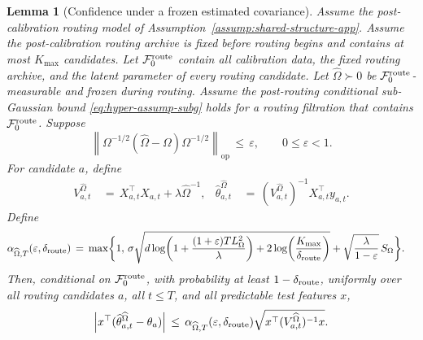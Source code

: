 \documentclass{article} %
\newtheorem{lemma}[theorem]{Lemma}
\begin{document}
\begin{lemma}[Confidence under a frozen estimated covariance]
\label{lem:confidence-under-frozen-omegahat-final}
Assume the post-calibration routing model of
Assumption~\ref{assump:shared-structure-app}.  Assume the post-calibration
routing archive is fixed before routing begins and contains at most
\(K_{\max}\) candidates. Let \(\mathcal F_0^{\rm route}\) contain all
calibration data, the fixed routing archive, and the latent parameter of every
routing candidate.
Let \(\widehat\Omega\succ0\) be
\(\mathcal F_0^{\rm route}\)-measurable and frozen during routing. Assume the
post-routing conditional sub-Gaussian bound
\eqref{eq:hyper-assump-subg} holds for a routing filtration that contains
\(\mathcal F_0^{\rm route}\). Suppose
\begin{equation}
\left\|
\Omega^{-1/2}(\widehat\Omega-\Omega)\Omega^{-1/2}
\right\|_{\mathrm{op}}
\,\leq\,
\varepsilon,
\qquad
0\leq\varepsilon<1.
\end{equation}
For candidate \(a\), define
\begin{equation}
\begin{aligned}
V_{a,t}^{\widehat\Omega}
&\,=\,
X_{a,t}^\top X_{a,t}+\lambda\widehat\Omega^{-1},
&
\widehat\theta_{a,t}^{\widehat\Omega}
&\,=\,
(V_{a,t}^{\widehat\Omega})^{-1}X_{a,t}^\top y_{a,t}.
\end{aligned}
\end{equation}
Define
\begin{equation}
\begin{aligned}
\alpha_{\widehat\Omega,T}(\varepsilon,\delta_{\rm route})
&\,=\,
\max\!\bigg\{
1,\,
\sigma\sqrt{
d\log\!\left(1+\frac{(1+\varepsilon)TL_\Omega^2}{\lambda}\right)
+
2\log\!\left(\frac{K_{\max}}{\delta_{\rm route}}\right)
}
+
\sqrt{\frac{\lambda}{1-\varepsilon}}\,S_\Omega
\bigg\}.
\end{aligned}
\end{equation}
Then, conditional on \(\mathcal F_0^{\rm route}\), with probability at least
\(1-\delta_{\rm route}\), uniformly over all routing candidates \(a\), all
\(t\le T\), and all predictable test features \(x\),
\begin{equation}
\left|
x^\top(\widehat\theta_{a,t}^{\widehat\Omega}-\theta_a)
\right|
\,\leq\,
\alpha_{\widehat\Omega,T}(\varepsilon,\delta_{\rm route})
\sqrt{x^\top(V_{a,t}^{\widehat\Omega})^{-1}x}.
\end{equation}
\end{lemma}
\end{document}
